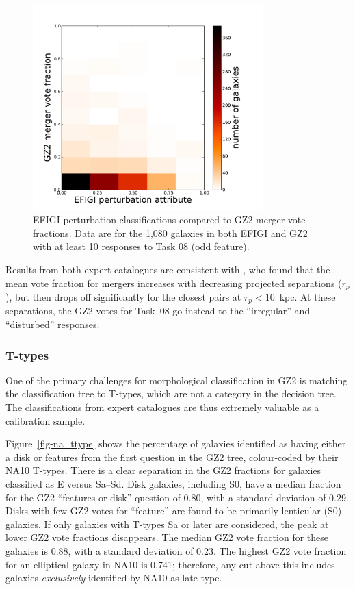 \documentclass[useAMS,usenatbib]{mn2e}
\begin{document}
\begin{figure}
\includegraphics[angle=0,width=3.5in]{figures/efigi_mergers.pdf}
\caption{EFIGI perturbation classifications compared to GZ2 merger vote fractions. Data are for the 1,080 galaxies in both EFIGI and GZ2 with at least 10 responses to Task 08 (odd feature). 
\label{fig-efigi_mergers}}
\end{figure}

Results from both expert catalogues are consistent with \citet{cas13}, who found that the mean vote fraction for mergers increases with decreasing projected separations ($r_p$), but then drops off significantly for the closest pairs at $r_p < 10$~kpc. At these separations, the GZ2 votes for Task~08 go instead to the ``irregular'' and ``disturbed'' responses. 

\subsubsection{T-types}

One of the primary challenges for morphological classification in GZ2 is matching the classification tree to T-types, which are not a category in the decision tree. The classifications from expert catalogues are thus extremely valuable as a calibration sample. 

Figure~\ref{fig-na_ttype} shows the percentage of galaxies identified as having either a disk or features from the first question in the GZ2 tree, colour-coded by their NA10 T-types. There is a clear separation in the GZ2 fractions for galaxies classified as E versus Sa--Sd. Disk galaxies, including S0, have a median fraction for the GZ2 ``features or disk'' question of 0.80, with a standard deviation of 0.29. Disks with few GZ2 votes for ``feature'' are found to be primarily lenticular (S0) galaxies. If only galaxies with T-types Sa or later are considered, the peak at lower GZ2 vote fractions disappears. The median GZ2 vote fraction for these galaxies is 0.88, with a standard deviation of 0.23. The highest GZ2 vote fraction for an elliptical galaxy in NA10 is 0.741; therefore, any cut above this includes galaxies {\it exclusively} identified by NA10 as late-type. 
\end{document}

